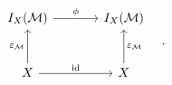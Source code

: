 \[
\begin{tikzcd}[column sep=large,row sep=large]
I_X(\mathcal M) \arrow[r,"\phi"] & I_X(\mathcal M)\\
X \arrow[u,"\varepsilon_{\mathcal M}"] \arrow[r,"\mathrm{id}"] & X \arrow[u,"\varepsilon_{\mathcal M}"']
\end{tikzcd}\quad .
\]
